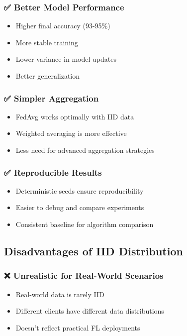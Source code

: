 \documentclass[12pt,a4paper]{article}
\begin{document}
\subsubsection{✅ Better Model Performance}
\begin{itemize}
    \item Higher final accuracy (93-95\%)
    \item More stable training
    \item Lower variance in model updates
    \item Better generalization
\end{itemize}

\subsubsection{✅ Simpler Aggregation}
\begin{itemize}
    \item FedAvg works optimally with IID data
    \item Weighted averaging is more effective
    \item Less need for advanced aggregation strategies
\end{itemize}

\subsubsection{✅ Reproducible Results}
\begin{itemize}
    \item Deterministic seeds ensure reproducibility
    \item Easier to debug and compare experiments
    \item Consistent baseline for algorithm comparison
\end{itemize}

\subsection{Disadvantages of IID Distribution}

\subsubsection{❌ Unrealistic for Real-World Scenarios}
\begin{itemize}
    \item Real-world data is rarely IID
    \item Different clients have different data distributions
    \item Doesn't reflect practical FL deployments
\end{itemize}
\end{document}
